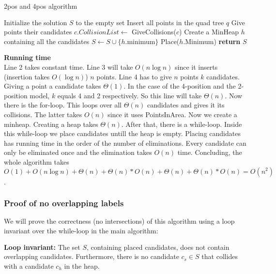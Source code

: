 \documentclass[crop=false,a4paper,oneside,11pt]{article}
\begin{document}
\begin{algorithm}[H]
\caption{2pos and 4pos algorithm}
\begin{algorithmic}[1]
\State Initialize the solution $S$ to the empty set
\State Insert all points in the quad tree $q$
\State Give points their candidates
\State $c.CollisionList\gets$ GiveCollisions($c$)
\EndFor
\State Create a MinHeap $h$ containing all the candidates
\State $S\gets S\cup \{h.$minimum$\}$
\State Place($h$.Minimum)
\EndWhile
\State \textbf{return} $S$
\EndProcedure
\end{algorithmic}
\end{algorithm}
\textbf{Running time}\\
Line 2 takes constant time. Line 3 will take $O(n\log n)$ since it inserts (insertion takes $O(\log n)$) $n$ points. Line 4 has to give $n$ points $k$ candidates. Giving a point a candidate takes $\Theta(1)$. In the case of the 4-position and the 2-position model, $k$ equals 4 and 2 respectively. So this line will take $\Theta(n)$. Now there is the for-loop. This loops over all $\Theta(n)$ candidates and gives it its collisions. The latter takes $O(n)$ since it uses PointsInArea. Now we create a minheap. Creating a heap takes $\Theta(n)$. After that, there is a while-loop. Inside this while-loop we place candidates untill the heap is empty. Placing candidates has running time in the order of the number of eliminations. Every candidate can only be eliminated once and the elimination takes $O(n)$ time. Concluding, the whole algorithm takes $O(1)+O(n\log n)+\Theta(n)+\Theta(n)*O(n)+\Theta(n)+\Theta(n)*O(n)=O(n^2)$.

\subsubsection{Proof of no overlapping labels}
We will prove the correctness (no intersections) of this algorithm using a loop invariant over the while-loop in the main algorithm:

\textbf{Loop invariant:} The set $S$, containing placed candidates, does not contain overlapping candidates. Furthermore, there is no candidate $c_s\in S$ that collides with a candidate $c_h$ in the heap.
\end{document}
